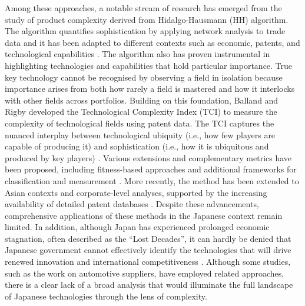 Among these approaches, a notable stream of research has emerged from the study of product complexity derived from Hidalgo-Hausmann (HH) algorithm\cite{Hidalgo2009}. 
The algorithm quantifies sophistication by applying network analysis to trade data and it has been adapted to different contexts such as economic, patents, and technological capabilities \cite{Hidalgo2021,Hidalgo2023,Hausmann2024,Balland2022,Chakraborty2020}. 
The algorithm also has proven instrumental in highlighting technologies and capabilities that hold particular importance. 
True key technology cannot be recognised by observing a field in isolation because importance arises from both how rarely a field is mastered and how it interlocks with other fields across portfolios.
Building on this foundation, Balland and Rigby \cite{Balland2016} developed the Technological Complexity Index (TCI) to measure the complexity of technological fields using patent data. 
The TCI captures the nuanced interplay between technological ubiquity (i.e., how few players are capable of producing it) and sophistication (i.e., how it is ubiquitous and produced by key players) \cite{Balland2018}. 
Various extensions and complementary metrics have been proposed, including fitness-based approaches \cite{Tacchella2012,Wu2016,Albeaik2017} and additional frameworks for classification and measurement \cite{Schmoch2008,Soete1987,Balassa1965,Mealy2019,PintarEssletzbichler2022}.
More recently, the method has been extended to Asian contexts and corporate-level analyses, supported by the increasing availability of detailed patent databases \cite{Jun2023,Dong2021}. 
Despite these advancements, comprehensive applications of these methods in the Japanese context remain limited. 
In addition, although Japan has experienced prolonged economic stagnation, often described as the “Lost Decades”, it can hardly be denied that Japanese government cannot effectively identify the technologies that will drive renewed innovation and international competitiveness \cite{Kobayashi2024}. 
Although some studies, such as the work on automotive suppliers\cite{Kito2018}, have employed related approaches, there is a clear lack of a broad analysis that would illuminate the full landscape of Japanese technologies through the lens of complexity.


